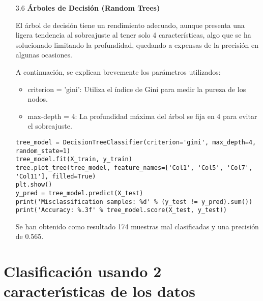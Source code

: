 \documentclass{article}
\begin{document}
\begin{itemize}

\item[3.6]  {\bf \'Arboles de Decisi\'on (Random Trees)}

El \'arbol de decisi\'on tiene un rendimiento adecuado, aunque presenta una ligera tendencia al sobreajuste al tener solo 4 caracter\'isticas, algo que se ha solucionado limitando la profundidad, quedando a expensas de la precisi\'on en algunas ocasiones.

A continuaci\'on, se explican brevemente los par\'ametros utilizados:

\begin{itemize}

\item
criterion = 'gini': Utiliza el \'indice de Gini para medir la pureza de los nodos.

\item
max-depth = 4: La profundidad m\'axima del árbol se fija en 4 para evitar el sobreajuste.

\end{itemize}

\begin{tcolorbox}[width=14cm]
\begin{scriptsize}
\begin{verbatim}
tree_model = DecisionTreeClassifier(criterion='gini', max_depth=4, random_state=1)
tree_model.fit(X_train, y_train)
tree.plot_tree(tree_model, feature_names=['Col1', 'Col5', 'Col7', 'Col11'], filled=True)
plt.show()
y_pred = tree_model.predict(X_test)
print('Misclassification samples: %d' % (y_test != y_pred).sum())
print('Accuracy: %.3f' % tree_model.score(X_test, y_test))
\end{verbatim}
\end{scriptsize}
\end{tcolorbox}

Se han obtenido como resultado 174 muestras mal clasificadas y una precisi\'on de 0.565.

\end{itemize}


\newpage

\section[4]{Clasificaci\'on usando 2 caracter\'{\i}sticas de los datos}
\end{document}
